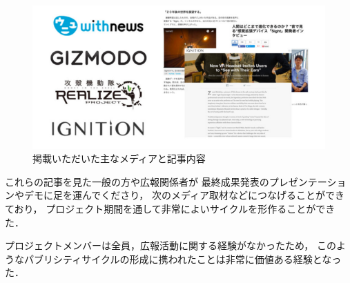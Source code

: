 \begin{figure}[h]
\begin{center}
\includegraphics[width=120mm, bb=0 0 674 330]{images/publicity/publicity.png}
\caption{掲載いただいた主なメディアと記事内容}
\end{center}
\end{figure}


これらの記事を見た一般の方や広報関係者が
最終成果発表のプレゼンテーションやデモに足を運んでくださり，
次のメディア取材などにつなげることができており，
プロジェクト期間を通して非常によいサイクルを形作ることができた．

プロジェクトメンバーは全員，広報活動に関する経験がなかったため，
このようなパブリシティサイクルの形成に携われたことは非常に価値ある経験となった．








